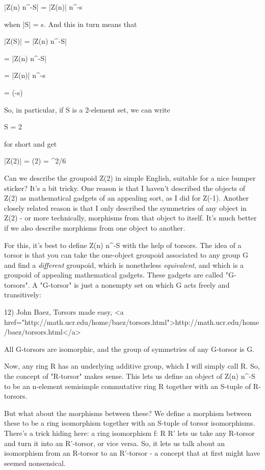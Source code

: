 |Z(n) \times  n^{-S}| = |Z(n)| \times  n^{-s}

when |S| = s.  And this in turn means that

|Z(S)| = |\sum Z(n) \times  n^{-S}|

= \sum |Z(n) \times  n^{-S}|

= \sum |Z(n)| \times  n^{-s}

= \zeta (-s)

So, in particular, if S is a 2-element set, we can write

S = 2 

for short and get

|Z(2)| = \zeta (2) = \pi ^{2}/6

Can we describe the groupoid Z(2) in simple English, suitable for a
nice bumper sticker?  It's a bit tricky.  One reason is that I haven't
described the objects of Z(2) as mathematical gadgets of an appealing
sort, as I did for Z(-1).  Another closely related reason is that I
only described the symmetries of any object in Z(2) - or more
technically, morphisms from that object to itself.  It's much better
if we also describe morphisms from one object to another.

For this, it's best to define Z(n) \times  n^{-S} with the
help of torsors.  The idea of a torsor is that you can take the
one-object groupoid associated to any group G and find a
\emph{different} groupoid, which is nonetheless \emph{equivalent}, and
which is a groupoid of appealing mathematical gadgets.  These gadgets
are called "G-torsors".  A "G-torsor" is just a nonempty set on which
G acts freely and transitively:

12) John Baez, Torsors made easy, <a href="http://math.ucr.edu/home/baez/torsors.html">http://math.ucr.edu/home/baez/torsors.html</a>

All G-torsors are isomorphic, and the group of symmetries of any G-torsor is G.

Now, any ring R has an underlying additive group, which I will simply
call R.  So, the concept of "R-torsor" makes sense.  This lets us
define an object of Z(n) \times  n^{-S} to be an n-element
semisimple commutative ring R together with an S-tuple of R-torsors.

But what about the morphisms between these?  We define a morphism
between these to be a ring isomorphism together with an S-tuple of
torsor isomorphisms. There's a trick hiding here: a ring isomorphism
f: R \to  R' lets us take any R-torsor and turn it into an
R'-torsor, or vice versa.  So, it lets us talk about an isomorphism
from an R-torsor to an R'-torsor - a concept that at first might have
seemed nonsensical.

